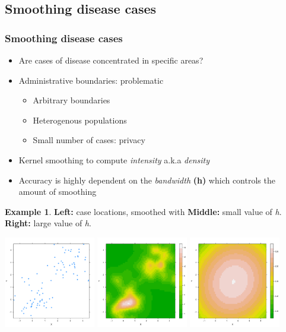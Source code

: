 \documentclass[notheorems]{beamer}
\theoremstyle{definition}
\theoremstyle{example}
\newtheorem{example}{Example}
\begin{document}
\subsection{Smoothing disease cases}
\begin{frame}\frametitle{Smoothing disease cases}
    \begin{itemize}
        \item Are cases of disease concentrated in specific areas?
        \item Administrative boundaries: problematic
            \begin{itemize}
                \item Arbitrary boundaries
                \item Heterogenous populations
                \item Small number of cases: privacy
            \end{itemize}
        \item \alert{Kernel smoothing} to compute \emph{intensity} a.k.a \emph{density}
        \item Accuracy is highly dependent on the \emph{bandwidth} \textbf{(h)} which controls the amount of smoothing
    \end{itemize}
    \begin{example}{\tiny{\textbf{Left:} case locations, smoothed with \textbf{Middle:} small value of \emph{h}. \textbf{Right:} large value of \emph{h}.}}
    \centerline{
        \label{fig:points-and-dkd}
        \centering
        \includegraphics[width=0.3\textwidth]{example-incidents}
        \includegraphics[width=0.3\textwidth]{example-incidents-undersmoothed}
        \includegraphics[width=0.3\textwidth]{example-incidents-oversmoothed}
    }
    \end{example}
\end{frame}
\end{document}
